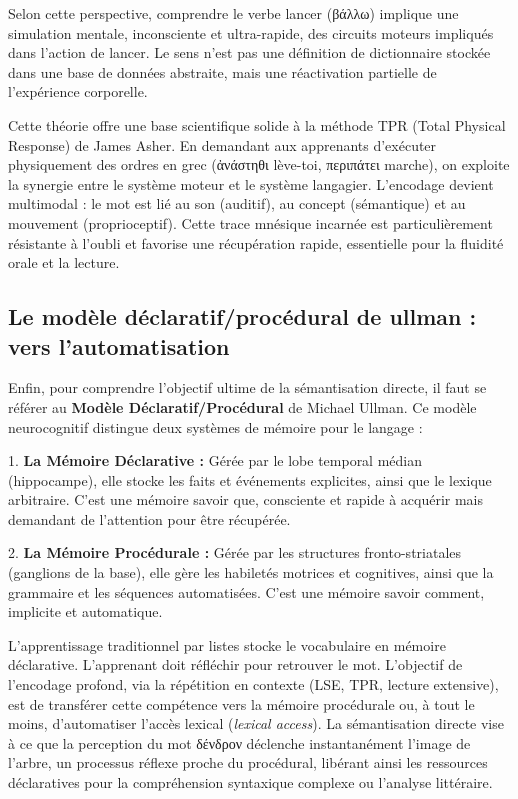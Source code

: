 Selon cette perspective, comprendre le verbe \og lancer\fg{} (βάλλω) implique une simulation
mentale, inconsciente et ultra-rapide, des circuits moteurs impliqués dans l'action de lancer. Le
sens n'est pas une définition de dictionnaire stockée dans une base de données abstraite, mais une
réactivation partielle de l'expérience corporelle.

Cette théorie offre une base scientifique solide à la méthode TPR (Total Physical Response) de James
Asher. En demandant aux apprenants d'exécuter physiquement des ordres en grec (ἀνάστηθι \- lève-toi,
περιπάτει \- marche), on exploite la synergie entre le système moteur et le système langagier.
L'encodage devient multimodal : le mot est lié au son (auditif), au concept (sémantique) et au
mouvement (proprioceptif). Cette \og trace mnésique incarnée\fg{} est particulièrement résistante à
l'oubli et favorise une récupération rapide, essentielle pour la fluidité orale et la
lecture.\cite{III-1-3-ref31}



\subsection{Le modèle déclaratif/procédural de ullman : vers l'automatisation}

Enfin, pour comprendre l'objectif ultime de la sémantisation directe, il faut se référer au
\textbf{Modèle Déclaratif/Procédural} de Michael Ullman. Ce modèle neurocognitif distingue deux
systèmes de mémoire pour le langage :

1. \textbf{La Mémoire Déclarative :} Gérée par le lobe temporal médian (hippocampe), elle stocke les
faits et événements explicites, ainsi que le lexique arbitraire. C'est une mémoire \og savoir
que\fg{}, consciente et rapide à acquérir mais demandant de l'attention pour être récupérée.

2. \textbf{La Mémoire Procédurale :} Gérée par les structures fronto-striatales (ganglions de la
base), elle gère les habiletés motrices et cognitives, ainsi que la grammaire et les séquences
automatisées. C'est une mémoire \og savoir comment\fg{}, implicite et
automatique.\cite{III-1-3-ref34}

L'apprentissage traditionnel par listes stocke le vocabulaire en mémoire déclarative. L'apprenant
doit \og réfléchir\fg{} pour retrouver le mot. L'objectif de l'encodage profond, via la répétition
en contexte (LSE, TPR, lecture extensive), est de transférer cette compétence vers la mémoire
procédurale ou, à tout le moins, d'automatiser l'accès lexical (\textit{lexical
access}).\cite{III-1-3-ref37} La sémantisation directe vise à ce que la perception du mot δένδρον
déclenche instantanément l'image de l'arbre, un processus réflexe proche du procédural, libérant
ainsi les ressources déclaratives pour la compréhension syntaxique complexe ou l'analyse littéraire.



